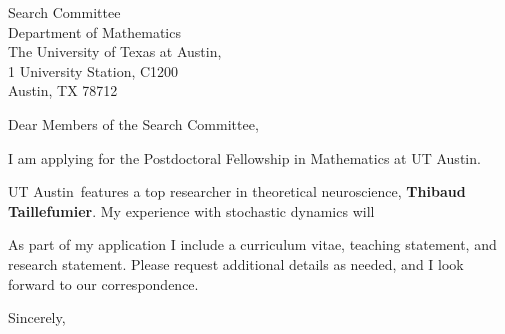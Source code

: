 \documentclass[11pt,a4paper]{letter}
\begin{document}

\def\School{UT Austin}

\begin{letter}
{Search Committee\\
Department of Mathematics\\
The University of Texas at Austin,\\
1 University Station, C1200\\
Austin, TX 78712
}


\opening{Dear Members of the Search Committee,}

I am applying for the Postdoctoral Fellowship in Mathematics at \School. 



\School~features a top researcher in theoretical neuroscience, \textbf{Thibaud Taillefumier}. My experience with stochastic dynamics will 



As part of my application I include a curriculum vitae, teaching statement, and research statement. Please request additional details as needed, and I look forward to our correspondence.

\closing{Sincerely,}
\end{letter}
\end{document}

